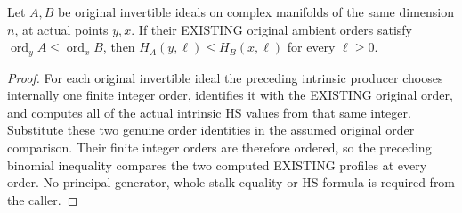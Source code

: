 \begin{theorem}
\label{hir:actual-invertible-order-comparison-entire-hs}
\leanok
{}
Let $A,B$ be original invertible ideals on complex manifolds of the same
dimension $n$, at actual points $y,x$. If their EXISTING original ambient
orders satisfy $\operatorname{ord}_y A\le\operatorname{ord}_x B$, then
$H_A(y,\ell)\le H_B(x,\ell)$ for every $\ell\ge0$.
\end{theorem}
\begin{proof}
For each original invertible ideal the preceding intrinsic producer chooses
internally one finite integer order, identifies it with the EXISTING
original order, and computes all of the actual intrinsic HS values from
that same integer. Substitute these two genuine order identities in the
assumed original order comparison. Their finite integer orders are
therefore ordered, so the preceding binomial inequality compares the two
computed EXISTING profiles at every order. No principal generator, whole
stalk equality or HS formula is required from the caller.
\end{proof}

